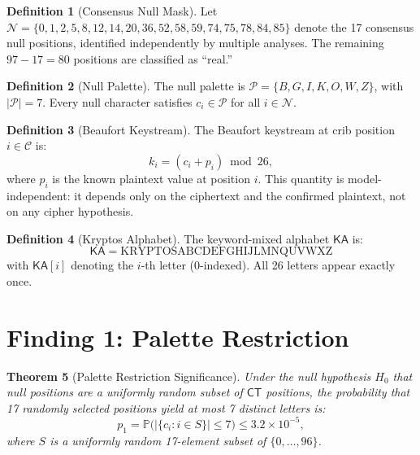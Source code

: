 \documentclass[11pt]{article}
\theoremstyle{plain}
\newtheorem{theorem}{Theorem}[section]
\theoremstyle{definition}
\newtheorem{definition}[theorem]{Definition}
\theoremstyle{remark}
\newcommand{\Prob}{\mathbb{P}}
\newcommand{\CT}{\mathsf{CT}}
\newcommand{\KA}{\mathsf{KA}}
\newcommand{\palette}{\mathcal{P}}
\begin{document}
\begin{definition}[Consensus Null Mask]
Let $\mathcal{N} = \{0, 1, 2, 5, 8, 12, 14, 20, 36, 52, 58, 59, 74, 75, 78, 84, 85\}$ denote the 17 consensus null positions, identified independently by multiple analyses. The remaining $97 - 17 = 80$ positions are classified as ``real.''
\end{definition}

\begin{definition}[Null Palette]
\label{def:palette}
The null palette is $\palette = \{B, G, I, K, O, W, Z\}$, with $\lvert\palette\rvert = 7$. Every null character satisfies $c_i \in \palette$ for all $i \in \mathcal{N}$.
\end{definition}

\begin{definition}[Beaufort Keystream]
\label{def:beaufort}
The Beaufort keystream at crib position $i \in \mathcal{C}$ is:
\begin{equation}
k_i = (c_i + p_i) \bmod 26,
\label{eq:beaufort-key}
\end{equation}
where $p_i$ is the known plaintext value at position $i$. This quantity is model-independent: it depends only on the ciphertext and the confirmed plaintext, not on any cipher hypothesis.
\end{definition}

\begin{definition}[Kryptos Alphabet]
The keyword-mixed alphabet $\KA$ is:
\[
\KA = \text{KRYPTOSABCDEFGHIJLMNQUVWXZ}
\]
with $\KA[i]$ denoting the $i$-th letter (0-indexed). All 26 letters appear exactly once.
\end{definition}

\section{Finding 1: Palette Restriction}
\label{sec:palette}

\begin{theorem}[Palette Restriction Significance]
\label{thm:palette}
Under the null hypothesis $H_0$ that null positions are a uniformly random subset of $\CT$ positions, the probability that 17 randomly selected positions yield at most 7 distinct letters is:
\begin{equation}
p_1 = \Prob\bigl(\lvert\{c_i : i \in S\}\rvert \leq 7\bigr) \leq 3.2 \times 10^{-5},
\label{eq:palette-p}
\end{equation}
where $S$ is a uniformly random 17-element subset of $\{0,\ldots,96\}$.
\end{theorem}
\end{document}
